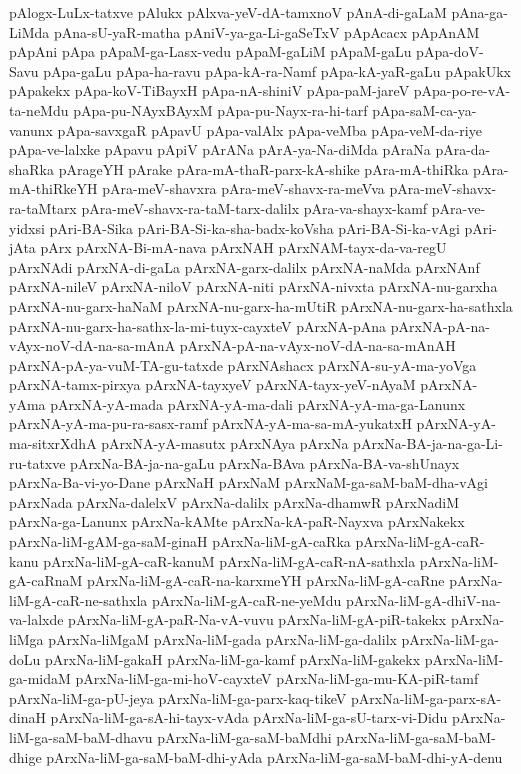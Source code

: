 {pAlogx-LuLx-tatxve
pAlukx
pAlxva-yeV-dA-tamxnoV
pAnA-di-gaLaM
pAna-ga-LiMda
pAna-sU-yaR-matha
pAniV-ya-ga-Li-gaSeTxV
pApAcacx
pApAnAM
pApAni
pApa
pApaM-ga-Lasx-vedu
pApaM-gaLiM
pApaM-gaLu
pApa-doV-Savu
pApa-gaLu
pApa-ha-ravu
pApa-kA-ra-Namf
pApa-kA-yaR-gaLu
pApakUkx
pApakekx
pApa-koV-TiBayxH
pApa-nA-shiniV
pApa-paM-jareV
pApa-po-re-vA-ta-neMdu
pApa-pu-NAyxBAyxM
pApa-pu-Nayx-ra-hi-tarf
pApa-saM-ca-ya-vanunx
pApa-savxgaR
pApavU
pApa-valAlx
pApa-veMba
pApa-veM-da-riye
pApa-ve-lalxke
pApavu
pApiV
pArANa
pArA-ya-Na-diMda
pAraNa
pAra-da-shaRka
pArageYH
pArake
pAra-mA-thaR-parx-kA-shike
pAra-mA-thiRka
pAra-mA-thiRkeYH
pAra-meV-shavxra
pAra-meV-shavx-ra-meVva
pAra-meV-shavx-ra-taMtarx
pAra-meV-shavx-ra-taM-tarx-dalilx
pAra-va-shayx-kamf
pAra-ve-yidxsi
pAri-BA-Sika
pAri-BA-Si-ka-sha-badx-koVsha
pAri-BA-Si-ka-vAgi
pAri-jAta
pArx
pArxNA-Bi-mA-nava
pArxNAH
pArxNAM-tayx-da-va-regU
pArxNAdi
pArxNA-di-gaLa
pArxNA-garx-dalilx
pArxNA-naMda
pArxNAnf
pArxNA-nileV
pArxNA-niloV
pArxNA-niti
pArxNA-nivxta
pArxNA-nu-garxha
pArxNA-nu-garx-haNaM
pArxNA-nu-garx-ha-mUtiR
pArxNA-nu-garx-ha-sathxla
pArxNA-nu-garx-ha-sathx-la-mi-tuyx-cayxteV
pArxNA-pAna
pArxNA-pA-na-vAyx-noV-dA-na-sa-mAnA
pArxNA-pA-na-vAyx-noV-dA-na-sa-mAnAH
pArxNA-pA-ya-vuM-TA-gu-tatxde
pArxNAshacx
pArxNA-su-yA-ma-yoVga
pArxNA-tamx-pirxya
pArxNA-tayxyeV
pArxNA-tayx-yeV-nAyaM
pArxNA-yAma
pArxNA-yA-mada
pArxNA-yA-ma-dali
pArxNA-yA-ma-ga-Lanunx
pArxNA-yA-ma-pu-ra-sasx-ramf
pArxNA-yA-ma-sa-mA-yukatxH
pArxNA-yA-ma-sitxrXdhA
pArxNA-yA-masutx
pArxNAya
pArxNa
pArxNa-BA-ja-na-ga-Li-ru-tatxve
pArxNa-BA-ja-na-gaLu
pArxNa-BAva
pArxNa-BA-va-shUnayx
pArxNa-Ba-vi-yo-Dane
pArxNaH
pArxNaM
pArxNaM-ga-saM-baM-dha-vAgi
pArxNada
pArxNa-dalelxV
pArxNa-dalilx
pArxNa-dhamwR
pArxNadiM
pArxNa-ga-Lanunx
pArxNa-kAMte
pArxNa-kA-paR-Nayxva
pArxNakekx
pArxNa-liM-gAM-ga-saM-ginaH
pArxNa-liM-gA-caRka
pArxNa-liM-gA-caR-kanu
pArxNa-liM-gA-caR-kanuM
pArxNa-liM-gA-caR-nA-sathxla
pArxNa-liM-gA-caRnaM
pArxNa-liM-gA-caR-na-karxmeYH
pArxNa-liM-gA-caRne
pArxNa-liM-gA-caR-ne-sathxla
pArxNa-liM-gA-caR-ne-yeMdu
pArxNa-liM-gA-dhiV-na-va-lalxde
pArxNa-liM-gA-paR-Na-vA-vuvu
pArxNa-liM-gA-piR-takekx
pArxNa-liMga
pArxNa-liMgaM
pArxNa-liM-gada
pArxNa-liM-ga-dalilx
pArxNa-liM-ga-doLu
pArxNa-liM-gakaH
pArxNa-liM-ga-kamf
pArxNa-liM-gakekx
pArxNa-liM-ga-midaM
pArxNa-liM-ga-mi-hoV-cayxteV
pArxNa-liM-ga-mu-KA-piR-tamf
pArxNa-liM-ga-pU-jeya
pArxNa-liM-ga-parx-kaq-tikeV
pArxNa-liM-ga-parx-sA-dinaH
pArxNa-liM-ga-sA-hi-tayx-vAda
pArxNa-liM-ga-sU-tarx-vi-Didu
pArxNa-liM-ga-saM-baM-dhavu
pArxNa-liM-ga-saM-baMdhi
pArxNa-liM-ga-saM-baM-dhige
pArxNa-liM-ga-saM-baM-dhi-yAda
pArxNa-liM-ga-saM-baM-dhi-yA-denu
}
